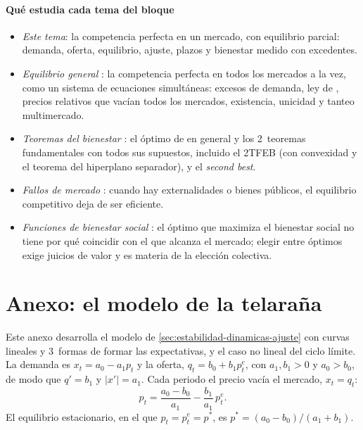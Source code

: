 \documentclass[11pt]{article}
\begin{document}
\paragraph{Qué estudia cada tema del bloque}

\begin{itemize}
\item \emph{Este tema}: la competencia perfecta en un mercado, con equilibrio parcial: demanda, oferta, equilibrio, ajuste, plazos y bienestar medido con excedentes.
\item \emph{Equilibrio general} : la competencia perfecta en todos los mercados a la vez, como un sistema de ecuaciones simultáneas: excesos de demanda, ley de , precios relativos que vacían todos los mercados, existencia, unicidad y tanteo multimercado.
\item \emph{Teoremas del bienestar} : el óptimo de  en general y los 2~teoremas fundamentales con todos sus supuestos, incluido el 2TFEB (con convexidad y el teorema del hiperplano separador), y el \emph{second best}.
\item \emph{Fallos de mercado} : cuando hay externalidades o bienes públicos, el equilibrio competitivo deja de ser eficiente.
\item \emph{Funciones de bienestar social} : el óptimo que maximiza el bienestar social no tiene por qué coincidir con el que alcanza el mercado; elegir entre óptimos exige juicios de valor y es materia de la elección colectiva.
\end{itemize}

\section{Anexo: el modelo de la telaraña}\label{anexo:telarana}

Este anexo desarrolla el modelo de \ref{sec:estabilidad-dinamicas-ajuste} con curvas lineales y 3~formas de formar las expectativas, y el caso no lineal del ciclo límite. La demanda es $x_t=a_0-a_1p_t$ y la oferta, $q_t=b_0+b_1p^e_t$, con $a_1,b_1>0$ y $a_0>b_0$, de modo que $q'=b_1$ y $\lvert x'\rvert=a_1$. Cada periodo el precio vacía el mercado, $x_t=q_t$:
\begin{equation}
p_t=\frac{a_0-b_0}{a_1}-\frac{b_1}{a_1}\,p^e_t. \label{eq:precio-telarana}
\end{equation}
El equilibrio estacionario, en el que $p_t=p^e_t=p^*$, es $p^*=(a_0-b_0)/(a_1+b_1)$.
\end{document}
